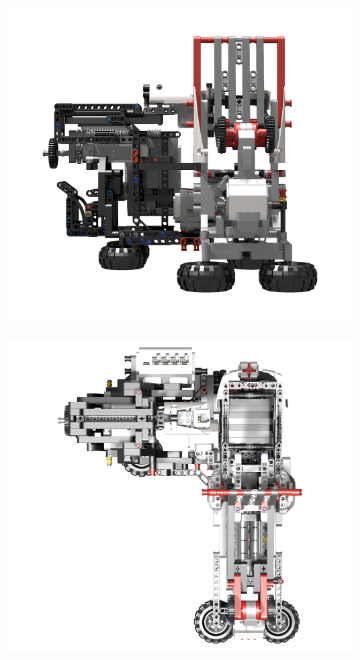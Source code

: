 \documentclass{report}
\begin{document}
\begin{figure}[H]
\begin{subfigure}[b]{0.275\textwidth}
    		\caption{}
    		\label{fig:rdrMkIIElevation3}
    	\end{subfigure}
    	\begin{subfigure}[b]{0.275\textwidth}
    		\includegraphics[width=\textwidth]{Resources/Images/rdrMkIIElevation4.png}
    		\caption{}
    		\label{fig:rdrMkIIElevation4}
    	\end{subfigure}
    	\hspace{10mm}
    	\begin{subfigure}[b]{0.275\textwidth}
    		\includegraphics[width=\textwidth]{Resources/Images/rdrMkIIElevation5.png}

\end{subfigure}
\end{figure}
\end{document}
